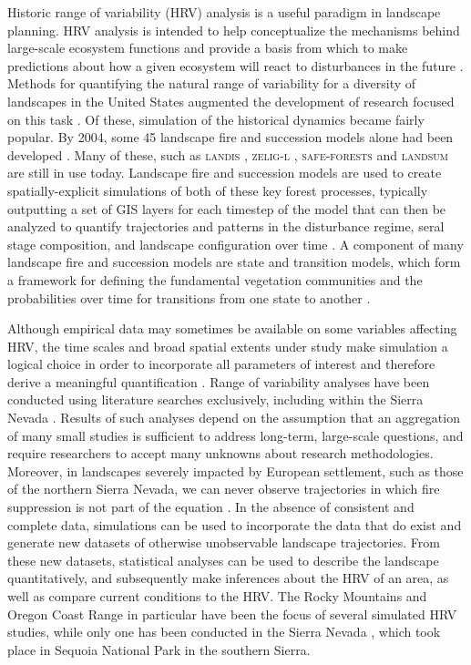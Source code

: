 Historic range of variability (HRV) analysis is a useful paradigm in landscape planning. HRV analysis is intended to help conceptualize the mechanisms behind large-scale ecosystem functions and provide a basis from which to make predictions about how a given ecosystem will react to disturbances in the future \citep{Nonaka2005,Landres1999}. Methods for quantifying the natural range of variability for a diversity of landscapes in the United States augmented the development of research focused on this task \citep{Landres1999}. Of these, simulation of the historical dynamics became fairly popular. By 2004, some 45 landscape fire and succession models alone had been developed \citep{Keane2004}. Many of these, such as \textsc{landis} \citep{He1999}, \textsc{zelig-l} \citep{Miller1999}, \textsc{safe-forests} \cite{Sessions1997} and \textsc{landsum} \citep{Keane2012} are still in use today. Landscape fire and succession models are used to create spatially-explicit simulations of both of these key forest processes, typically outputting a set of GIS layers for each timestep of the model that can then be analyzed to quantify trajectories and patterns in the disturbance regime, seral stage composition, and landscape configuration over time \citep{Keane2004}. A component of many landscape fire and succession models are state and transition models, which form a framework for defining the fundamental vegetation communities and the probabilities over time for transitions from one state to another \citep{Stringham2003,Blankenship2015}.

Although empirical data may sometimes be available on some variables affecting HRV, the time scales and broad spatial extents under study make simulation a logical choice in order to incorporate all parameters of interest and therefore derive a meaningful quantification \citep{Swetnam1999,Mladenoff1999}. Range of variability analyses have been conducted using literature searches exclusively, including within the Sierra Nevada \citep{Safford2013}. Results of such analyses depend on the assumption that an aggregation of many small studies is sufficient to address long-term, large-scale questions, and require researchers to accept many unknowns about research methodologies. Moreover, in landscapes severely impacted by European settlement, such as those of the northern Sierra Nevada, we can never observe trajectories in which fire suppression is not part of the equation \citep{Keane2012}. In the absence of consistent and complete data, simulations can be used to incorporate the data that do exist and generate new datasets of otherwise unobservable landscape trajectories. From these new datasets, statistical analyses can be used to describe the landscape quantitatively, and subsequently make inferences about the HRV of an area, as well as compare current conditions to the HRV. The Rocky Mountains and Oregon Coast Range in particular have been the focus of several simulated HRV studies, while only one has been conducted in the Sierra Nevada \citep{Miller1999}, which took place in Sequoia National Park in the southern Sierra. 

